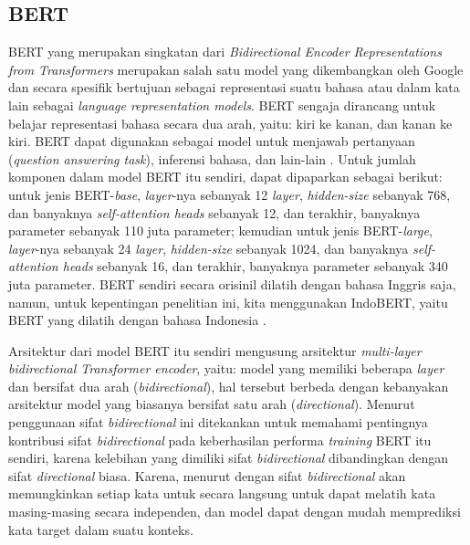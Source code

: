 \subsection{BERT}
BERT yang merupakan singkatan dari \emph{Bidirectional Encoder Representations from Transformers} merupakan salah satu model yang dikembangkan oleh Google dan secara spesifik bertujuan sebagai representasi suatu bahasa atau dalam kata lain sebagai \emph{language representation models}. BERT sengaja dirancang untuk belajar representasi bahasa secara dua arah, yaitu: kiri ke kanan, dan kanan ke kiri. BERT dapat digunakan sebagai model untuk menjawab pertanyaan (\emph{question answering task}), inferensi bahasa, dan lain-lain \citep{devlin-etal-2019-bert}. Untuk jumlah komponen dalam model BERT itu sendiri, dapat dipaparkan sebagai berikut: untuk jenis BERT-\emph{base}, \emph{layer}-nya sebanyak 12 \emph{layer}, \emph{hidden-size} sebanyak 768, dan banyaknya \emph{self-attention heads} sebanyak 12, dan terakhir, banyaknya parameter sebanyak 110 juta parameter; kemudian untuk jenis BERT-\emph{large}, \emph{layer}-nya sebanyak 24 \emph{layer}, \emph{hidden-size} sebanyak 1024, dan banyaknya \emph{self-attention heads} sebanyak 16, dan terakhir, banyaknya parameter sebanyak 340 juta parameter. BERT sendiri secara orisinil dilatih dengan bahasa Inggris saja, namun, untuk kepentingan penelitian ini, kita menggunakan IndoBERT, yaitu BERT yang dilatih dengan bahasa Indonesia \citep{koto2020indolem}.

Arsitektur dari model BERT itu sendiri mengusung arsitektur \emph{multi-layer bidirectional Transformer encoder}, yaitu: model yang memiliki beberapa \emph{layer} dan bersifat dua arah (\emph{bidirectional}), hal tersebut berbeda dengan kebanyakan arsitektur model yang biasanya bersifat satu arah (\emph{directional}). Menurut 
\citet{devlin-etal-2019-bert} penggunaan sifat \emph{bidirectional} ini ditekankan untuk memahami pentingnya kontribusi sifat \emph{bidirectional} pada keberhasilan performa \emph{training} BERT itu sendiri, karena kelebihan yang dimiliki sifat \emph{bidirectional} dibandingkan dengan sifat \emph{directional} biasa. Karena, menurut \citet{devlin-etal-2019-bert} dengan sifat \emph{bidirectional} akan memungkinkan setiap kata untuk secara langsung untuk dapat melatih kata masing-masing secara independen, dan model dapat dengan mudah memprediksi kata target dalam suatu konteks.

